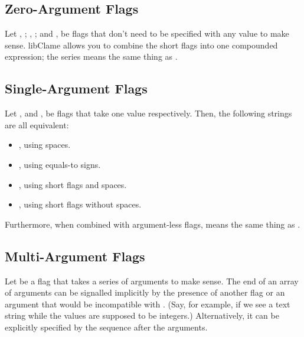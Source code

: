 \subsection{Zero-Argument Flags}

Let , ; , ; and ,  be flags that don't need to be specified with any value to make sense. libClame allows you to combine the short flags into one compounded expression; the series  means the same thing as .

\subsection{Single-Argument Flags}

Let ,  and ,  be flags that take one value respectively. Then, the following strings are all equivalent:

\begin{itemize}
	\item {}, using spaces.
	\item {}, using equals-to signs.
	\item {}, using short flags and spaces.
	\item {}, using short flags without spaces.
\end{itemize}

Furthermore, when combined with argument-less flags,  means the same thing as .

\subsection{Multi-Argument Flags}

Let  be a flag that takes a series of arguments to make sense. The end of an array of arguments can be signalled implicitly by the presence of another flag or an argument that would be incompatible with . (Say, for example, if we see a text string while the values are supposed to be integers.) Alternatively, it can be explicitly specified by the sequence \monotext{--} after the arguments.

